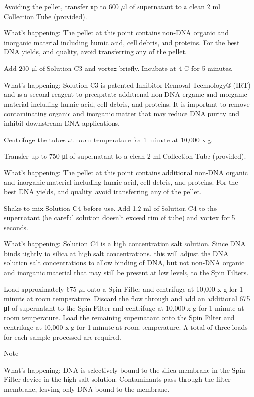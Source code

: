 \documentclass[12pt]{../SOP3_alpha}
\begin{document}
\NP Avoiding the pellet, transfer up to 600 $\mu$l of supernatant to a clean 2 ml Collection Tube (provided).

What's happening: The pellet at this point contains non-DNA organic and inorganic material including humic acid, cell debris, and proteins. For the
best DNA yields, and quality, avoid transferring any of the pellet.

\NP Add 200 μl of Solution C3 and vortex briefly. Incubate at 4 \degree C for 5 minutes.

What's happening: Solution C3 is patented Inhibitor Removal Technology® (IRT) and is a second reagent to precipitate additional non-DNA organic
and inorganic material including humic acid, cell debris, and proteins. It is important to remove contaminating organic and inorganic matter that may
reduce DNA purity and inhibit downstream DNA applications.

\NP Centrifuge the tubes at room temperature for 1 minute at 10,000 x g.

\NP Transfer up to 750 μl of supernatant to a clean 2 ml Collection Tube (provided).

What's happening: The pellet at this point contains additional non-DNA organic and inorganic material including humic acid, cell debris, and proteins. For the best DNA yields, and quality, avoid transferring any of the pellet.

\NP Shake to mix Solution C4 before use. Add 1.2 ml of Solution C4 to the supernatant (be careful solution doesn’t exceed rim of tube) and vortex for 5 seconds.

What's happening: Solution C4 is a high concentration salt solution. Since DNA binds tightly to silica at high salt concentrations, this will adjust the
DNA solution salt concentrations to allow binding of DNA, but not non-DNA organic and inorganic material that may still be present at low levels, to the Spin Filters.

\NP Load approximately 675 $\mu$l onto a Spin Filter and centrifuge at 10,000 x g for 1 minute at room temperature. Discard the flow through and add an additional 675 μl of supernatant to the Spin Filter and centrifuge at 10,000 x g for 1 minute at room temperature. Load the remaining supernatant onto the Spin Filter and centrifuge at 10,000 x g for 1 minute at room temperature. A total of three loads for each sample processed are required.

Note

What's happening: DNA is selectively bound to the silica membrane in the Spin Filter device in the high salt solution. Contaminants pass through the
filter membrane, leaving only DNA bound to the membrane.
\end{document}
